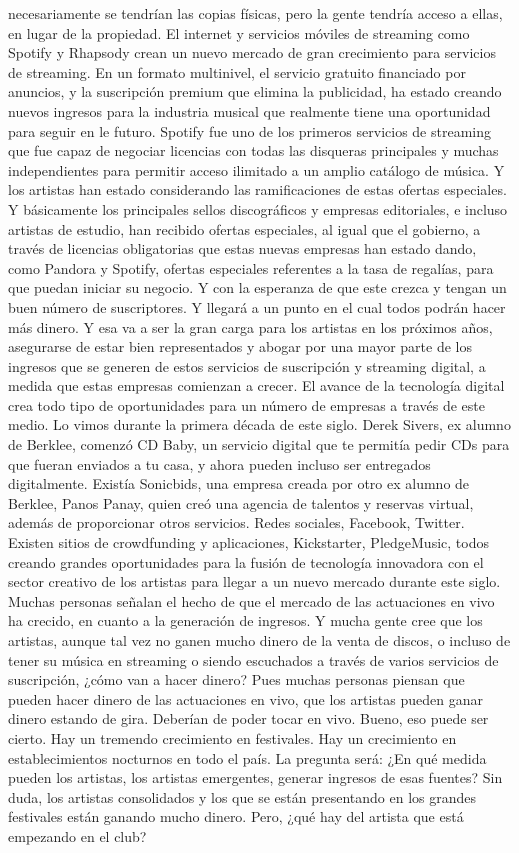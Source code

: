 \documentclass[10pt]{book}
\begin{document}
necesariamente se tendrían las copias físicas, pero la gente tendría acceso a ellas, en lugar de la propiedad. El internet y servicios móviles de streaming como Spotify y Rhapsody crean un nuevo mercado de gran crecimiento para servicios de streaming. En un formato multinivel, el servicio gratuito financiado por anuncios, y la suscripción premium que elimina la publicidad, ha estado creando nuevos ingresos para la industria musical que realmente tiene una oportunidad para seguir en le futuro. Spotify fue uno de los primeros servicios de streaming que fue capaz de negociar licencias con todas las disqueras principales y muchas independientes para permitir acceso ilimitado a un amplio  catálogo de música. Y los artistas han estado considerando las ramificaciones de estas ofertas especiales. Y básicamente los principales sellos discográficos y empresas editoriales, e incluso artistas de estudio, han recibido ofertas especiales,  al igual que el gobierno, a través de licencias obligatorias que estas nuevas empresas han estado dando, como Pandora y Spotify, ofertas especiales referentes a la tasa de regalías, para que puedan iniciar su negocio. Y con la esperanza de que este crezca y tengan un buen número de suscriptores. Y llegará a un punto en el cual todos podrán hacer más dinero. Y esa va a ser la gran carga para los artistas en los próximos años, asegurarse de estar bien representados y abogar por una mayor parte de los ingresos que se generen de estos servicios de suscripción y streaming digital, a medida que estas empresas comienzan a crecer. El avance de la tecnología digital crea todo tipo de oportunidades para un número de empresas a través de este medio. Lo vimos durante la primera década de este siglo. Derek Sivers, ex alumno de Berklee, comenzó CD Baby, un servicio digital que te permitía pedir CDs para que fueran enviados a tu casa, y ahora pueden incluso ser entregados digitalmente. Existía Sonicbids, una empresa creada por otro ex alumno de Berklee, Panos Panay, quien creó una agencia de talentos y reservas virtual, además de proporcionar otros servicios. Redes sociales, Facebook, Twitter. Existen sitios de crowdfunding y aplicaciones, Kickstarter, PledgeMusic, todos creando grandes oportunidades para la fusión de tecnología innovadora con el sector creativo de los artistas para llegar a un nuevo mercado durante este siglo. Muchas personas señalan el hecho de que el mercado de las actuaciones en vivo ha crecido, en cuanto a la generación de ingresos. Y mucha gente cree que los artistas, aunque tal vez no ganen mucho dinero de la venta de discos, o incluso de tener su música en streaming o siendo escuchados a través de varios servicios de suscripción, ¿cómo van a hacer dinero? Pues muchas personas piensan que pueden hacer dinero de las actuaciones en vivo, que los artistas pueden ganar dinero estando de gira. Deberían de poder tocar en vivo. Bueno, eso puede ser cierto. Hay un tremendo crecimiento en festivales. Hay un crecimiento en establecimientos nocturnos en todo el país. La pregunta será: ¿En qué medida pueden los artistas, los artistas emergentes, generar ingresos de esas fuentes? Sin duda, los artistas consolidados y los que se están presentando en los grandes  festivales están ganando mucho dinero. Pero, ¿qué hay del artista que está empezando en el club? 
\end{document}
